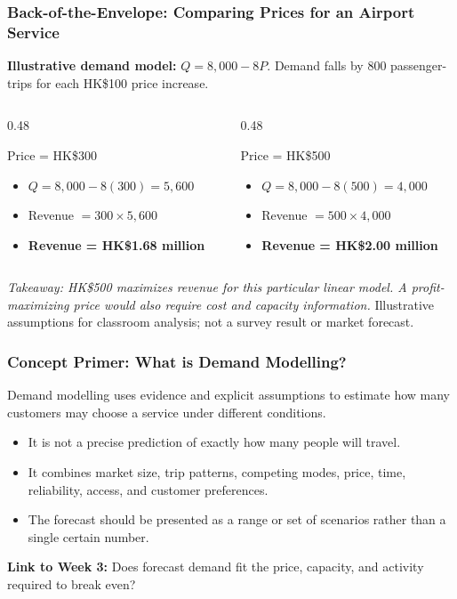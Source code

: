 \documentclass{beamer}
\begin{document}
\begin{frame}[t,shrink=10]
\frametitle{Back-of-the-Envelope: Comparing Prices for an Airport Service}
\textbf{Illustrative demand model:} $Q=8{,}000-8P$. Demand falls by 800 passenger-trips for each HK\$100 price increase.
\begin{columns}[T]
\begin{column}{0.48\textwidth}\begin{block}{Price = HK\$300}
\begin{itemize}
\item $Q=8{,}000-8(300)=5{,}600$
\item Revenue $=300\times5{,}600$
\item \textbf{Revenue = HK\$1.68 million}
\end{itemize}\end{block}\end{column}
\begin{column}{0.48\textwidth}\begin{block}{Price = HK\$500}
\begin{itemize}
\item $Q=8{,}000-8(500)=4{,}000$
\item Revenue $=500\times4{,}000$
\item \textbf{Revenue = HK\$2.00 million}
\end{itemize}\end{block}\end{column}
\end{columns}
\textit{Takeaway: HK\$500 maximizes revenue for this particular linear model. A profit-maximizing price would also require cost and capacity information.}
\vfill{\tiny Illustrative assumptions for classroom analysis; not a survey result or market forecast.}
\end{frame}


\begin{frame}[t]
\frametitle{Concept Primer: What is Demand Modelling?}
Demand modelling uses evidence and explicit assumptions to estimate how many customers may choose a service under different conditions.
\begin{itemize}
\item It is not a precise prediction of exactly how many people will travel.
\item It combines market size, trip patterns, competing modes, price, time, reliability, access, and customer preferences.
\item The forecast should be presented as a range or set of scenarios rather than a single certain number.
\end{itemize}
\textbf{Link to Week 3:} Does forecast demand fit the price, capacity, and activity required to break even?
\end{frame}
\end{document}
